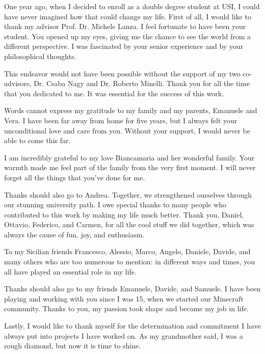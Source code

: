 
\begin{acknowledgements}

\addchaptertocentry{\acknowledgementname}
One year ago, when I decided to enroll as a double degree student at USI, I could have never imagined how that could change my life. First of all, I would like to thank my advisor Prof. Dr. Michele Lanza. I feel fortunate to have been your student. You opened up my eyes, giving me the chance to see the world from a different perspective. I was fascinated by your senior experience and by your philosophical thoughts. 

This endeavor would not have been possible without the support of my two co-advisors, Dr. Csaba Nagy and Dr. Roberto Minelli. Thank you for all the time that you dedicated to me. It was essential for the success of this work.

Words cannot express my gratitude to my family and my parents, Emanuele and Vera. I have been far away from home for five years, but I always felt your unconditional love and care from you. Without your support, I would never be able to come this far. 

I am incredibly grateful to my love Biancamaria and her wonderful family. Your warmth made me feel part of the family from the very first moment. I will never forget all the things that you've done for me.   

Thanks should also go to Andrea. Together, we strengthened ourselves through our stunning university path. 
I owe special thanks to many people who contributed to this work by making my life much better. Thank you, Daniel, Ottavio, Federico, and Carmen, for all the cool stuff we did together, which was always the cause of fun, joy, and enthusiasm.

To my Sicilian friends Francesco, Alessio, Marco, Angelo, Daniele, Davide, and many others who are too numerous to mention: in different ways and times, you all have played an essential role in my life. 

Thanks should also go to my friends Emanuele, Davide, and Samuele. I have been playing and working with you since I was 15, when we started our Minecraft community. Thanks to you, my passion took shape and became my job in life.

Lastly, I would like to thank myself for the determination and commitment I have always put into projects I have worked on. As my grandmother said, I was a rough diamond, but now it is time to shine. 


\end{acknowledgements}